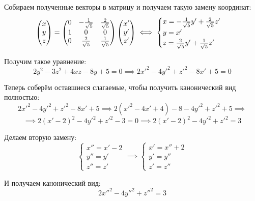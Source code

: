 Собираем полученные векторы в матрицу и получаем такую замену координат:
\[
    \begin{pmatrix}
        x \\
        y \\
        z
    \end{pmatrix}
    =
    \begin{pmatrix}
        0 & -\frac{1}{\sqrt{5}} & \frac{2}{\sqrt{5}} \\
        1 & 0                & 0               \\
        0 & \frac{2}{\sqrt{5}}  & \frac{1}{\sqrt{5}}
    \end{pmatrix}
    \begin{pmatrix}
        x' \\
        y' \\
        z'
    \end{pmatrix}
    \iff
    \begin{cases}
        x = -\frac{1}{\sqrt{5}} y' + \frac{2}{\sqrt{5}} z' \\
        y = x'                                       \\
        z = \frac{2}{\sqrt{5}} y' + \frac{1}{\sqrt{5}} z'
    \end{cases}
\]

Получим такое уравнение:
\[
    2y^2 - 3z^2 + 4xz - 8y + 5 = 0 \implies 2{x'}^2 - 4{y'}^2 + {z'}^2 - 8x' + 5 = 0
\]

Теперь соберём оставшиеся слагаемые, чтобы получить канонический вид полностью:
\[
    2{x'}^2 - 4{y'}^2 + {z'}^2 - 8x' + 5
    \implies
    2({x'}^2 - 4x' + 4) - 8 - 4{y'}^2 + {z'}^2 + 5 \implies
\]
\[
    \implies
    2(x' - 2)^2 - 4{y'}^2 + {z'}^2 - 3 = 0
    \implies
    2(x' - 2)^2 - 4{y'}^2 + {z'}^2 = 3
\]

Делаем вторую замену:
\[
    \begin{cases}
        x'' = x' - 2 \\
        y'' = y'     \\
        z'' = z'
    \end{cases}
    \implies
    \begin{cases}
        x' = x'' + 2 \\
        y' = y''     \\
        z' = z''
    \end{cases}
\]

И получаем канонический вид:
\[
    2{x''}^2 - 4{y''}^2 + {z''}^2 = 3
\]

